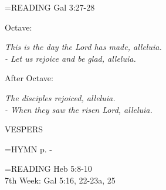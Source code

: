 \hangindent=\parindent \small{\uppercase{READING}}    Gal 3:27-28 \textbf{   \\}

\begin{center}
\end{center}Octave:\begin{center}\textit{	This is the day the Lord has made, alleluia.\\
- Let us rejoice and be glad, alleluia.}
\end{center}After Octave:\begin{center}\textit{	The disciples rejoiced, alleluia.\\
- When they saw the risen Lord, alleluia.}
\end{center}

\begin{flushleft}\normalsize VESPERS\\\end{flushleft}

\hangindent=\parindent \small{\uppercase{HYMN} p. \pageref{easter:firstHymn}-\pageref{easter:lastHymn}\\}

\hangindent=\parindent \small{\uppercase{READING}}    Heb 5:8-10 \textbf{   \\}
7th Week:	Gal 5:16, 22-23a, 25    
